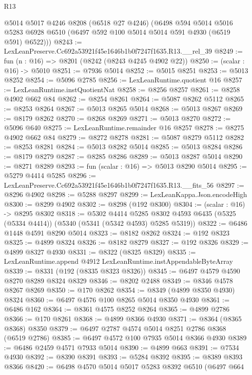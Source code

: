 \begin{lexlean}{R13}
\begin{coremodule}
      @5014
      @5017
      @4246
      @8208
      (@6518 @27 @4246)
      (@6498
        @594
        @5014
        @5016
        @5283
        @6928
        @6510
        (@6497 @592 @100 @5014 @5014 @591 @4930 (@6519 @591) @6522)))
@8243 := LexLeanPreserve.Cc692a53921f45e1646b1b0f7247f1635.R13.__rel_39
@8249 := fun (n : @16) => @8201 (@8242 (@8243 @4245 @4902 @22))
@8250 := (scalar : @16) -> @5010
@8251 := @7936 @5014
@8252 := @5015 @8251
@8253 := @5013 @8252
@8254 := @5096 @2785
@8256 := LexLeanRuntime.quotient @16
@8257 := LexLeanRuntime.instQuotientNat
@8258 := @8256 @8257
@8261 := @8258 @4902 @662 @84
@8262 := @8254 @8261
@8264 := @5087 @8262 @5112
@8265 := @8253 @8264
@8267 := @5013 @8265 @5014
@8268 := @5013 @8267
@8269 := @8179 @8262
@8270 := @8268 @8269
@8271 := @5013 @8270
@8272 := @5096 @640
@8275 := LexLeanRuntime.remainder @16 @8257
@8278 := @8275 @4902 @662 @84
@8279 := @8272 @8278
@8281 := @5087 @8279 @5112
@8282 := @8253 @8281
@8284 := @5013 @8282 @5014
@8285 := @5013 @8284
@8286 := @8179 @8279
@8287 := @8285 @8286
@8289 := @5013 @8287 @5014
@8290 := @8271 @8289
@8293 := fun (scalar : @16) => @5013 @8290 @5014
@8295 := @5279 @4414 @5285
@8296 := LexLeanPreserve.Cc692a53921f45e1646b1b0f7247f1635.R13.__fits_56
@8297 := @8296 @4902
@8298 := @5288 @8297
@8299 := LexLeanKappa.Json.encodeHigh
@8300 := @8299 @4902
@8302 := @8298 (@192 @8300)
@8304 := (scalar : @16) -> @8295 @8302
@8318 := @5302
    @4414
    @5285
    @8302
    @4593
    @6435
    (@5325 (@5334 @4414))
    (@5340 (@5341 (@5342 @4593) @5285 @5319))
@8322 := @6486 @1448 @4591 @8290 @5014
@8323 := @8182 @8262
@8324 := @192 @8323
@8325 := @4899 @8324
@8326 := @8182 @8279
@8327 := @192 @8326
@8329 := @4899 @8327 @4930
@8331 := @8322 (@8325 @8329)
@8335 := LexLeanRuntime.append @4912 LexLeanRuntime.instAppendableByteArray
@8339 := @8331 (@192 (@8335 @8323 @8326))
@8345 := @6497 @4579 @4590 @8270 @8289 @8324 @8329
@8346 := @8202 @2488
@8349 := @8346 @4578 @8267 @8269
@8350 := @170 @8262
@8354 := @8349 (@4899 @8350 @4930) @8324
@8360 := @6497 @4576 @100 @8265 @5014 @8350 @4930
@8361 := @6486 @162
@8364 := @8361 @4575 @8252 @8264
@8365 := @4899 @2786
@8366 := @170 @8261
@8368 := @4899 @8366 @4930
@8371 := @8364 (@8365 @8368) @8350
@8379 := @6497 @2787 @4574 @5014 @8251 @2786 @8368 (@6519 @2786)
@8385 := @6497 @4572 @100 @7935 @5014 @8366 @4930
@8389 := @6486 @2459 @4571 @7933 @5014
@8390 := @4899 @663
@8391 := @7534 @4930
@8392 := @8390 @8391
@8393 := @5284 @8392
@8395 := @8389 @8393 @8366
@8420 := @6498
    @4570
    @5014
    @5017
    @5283
    @8392
    @6510
    (@6497
      @664

\end{coremodule}
\end{lexlean}
